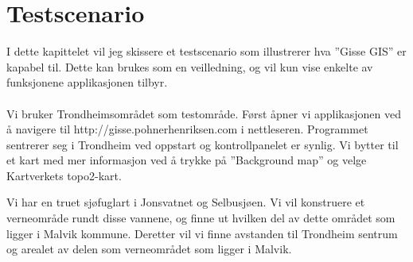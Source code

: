 \documentclass[12pt,twoside,onecolumn]{article}
\begin{document}
\section{Testscenario}

	I dette kapittelet vil jeg skissere et testscenario som illustrerer hva ''Gisse GIS'' er kapabel til. Dette kan brukes som en veilledning, og vil kun vise enkelte av funksjonene applikasjonen tilbyr.
	\\ \\
	Vi bruker Trondheimsområdet som testområde. Først åpner vi applikasjonen ved å navigere til http://gisse.pohnerhenriksen.com i nettleseren. Programmet sentrerer seg i Trondheim ved oppstart og kontrollpanelet er synlig. Vi bytter til et kart med mer informasjon ved å trykke på ''Background map'' og velge Kartverkets topo2-kart. 
	
	Vi har en truet sjøfuglart i Jonsvatnet og Selbusjøen. Vi vil konstruere et verneområde rundt disse vannene, og finne ut hvilken del av dette området som ligger i Malvik kommune. Deretter vil vi finne avstanden til Trondheim sentrum og arealet av delen som verneområdet som ligger i Malvik.
	
\end{document}
